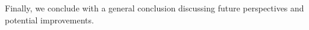 \documentclass[12pt,a4paper]{report}
\begin{document}
Finally, we conclude with a general conclusion discussing future perspectives and potential improvements.










\end{document}
